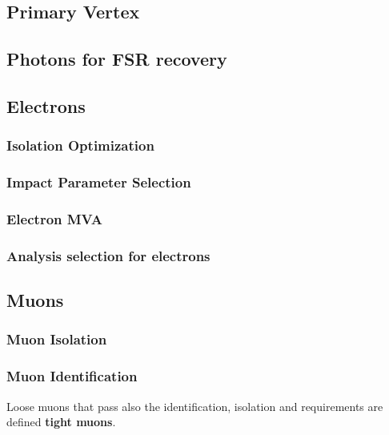 \subsection{Primary Vertex}


\subsection{Photons for FSR recovery}
\label{sec:FSRphotons}


\subsection{Electrons}
\subsubsection{Isolation Optimization}
\label{sec:eleiso}

\subsubsection{Impact Parameter Selection}
\label{sec:eleSIP}

\subsubsection{Electron MVA}
\label{sec:eleMVA}

\subsubsection{Analysis selection for electrons}%
\label{sec:ele_selection}


\subsection{Muons}
\subsubsection{Muon Isolation}
\label{sec:muoniso}

\subsubsection{Muon Identification}


Loose muons that pass also the identification, isolation and \SIPthreeD requirements are defined \textbf{tight muons}.

